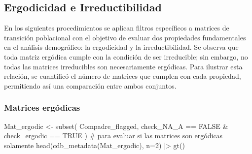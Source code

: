 \documentclass[
  12pt,
  letterpaper,
]{book}
\newenvironment{Shaded}{\begin{snugshade}}{\end{snugshade}}
\newcommand{\AttributeTok}[1]{\textcolor[rgb]{0.40,0.45,0.13}{#1}}
\newcommand{\CommentTok}[1]{\textcolor[rgb]{0.37,0.37,0.37}{#1}}
\newcommand{\ConstantTok}[1]{\textcolor[rgb]{0.56,0.35,0.01}{#1}}
\newcommand{\DecValTok}[1]{\textcolor[rgb]{0.68,0.00,0.00}{#1}}
\newcommand{\FunctionTok}[1]{\textcolor[rgb]{0.28,0.35,0.67}{#1}}
\newcommand{\NormalTok}[1]{\textcolor[rgb]{0.00,0.23,0.31}{#1}}
\newcommand{\OtherTok}[1]{\textcolor[rgb]{0.00,0.23,0.31}{#1}}
\newcommand{\SpecialCharTok}[1]{\textcolor[rgb]{0.37,0.37,0.37}{#1}}
\begin{document}
\subsection{Ergodicidad e
Irreductibilidad}\label{ergodicidad-e-irreductibilidad}

En los siguientes procedimientos se aplican filtros específicos a
matrices de transición poblacional con el objetivo de evaluar dos
propiedades fundamentales en el análisis demográfico: la ergodicidad y
la irreductibilidad. Se observa que toda matriz ergódica cumple con la
condición de ser irreducible; sin embargo, no todas las matrices
irreducibles son necesariamente ergódicas. Para ilustrar esta relación,
se cuantificó el número de matrices que cumplen con cada propiedad,
permitiendo así una comparación entre ambos conjuntos.

\subsubsection{Matrices ergódicas}\label{matrices-erguxf3dicas}

\begin{Shaded}
\begin{Highlighting}[]
\NormalTok{Mat\_ergodic }\OtherTok{\textless{}{-}} \FunctionTok{subset}\NormalTok{(}
\NormalTok{  Compadre\_flagged,}
\NormalTok{  check\_NA\_A }\SpecialCharTok{==} \ConstantTok{FALSE} \SpecialCharTok{\&}\NormalTok{ check\_ergodic }\SpecialCharTok{==} \ConstantTok{TRUE}
\NormalTok{) }\CommentTok{\# para evaluar si las matrices son ergódicas solamente}
\FunctionTok{head}\NormalTok{(}\FunctionTok{cdb\_metadata}\NormalTok{(Mat\_ergodic), }\AttributeTok{n=}\DecValTok{2}\NormalTok{) }\SpecialCharTok{|\textgreater{}} 
  \FunctionTok{gt}\NormalTok{()}
\end{Highlighting}
\end{Shaded}
\end{document}
